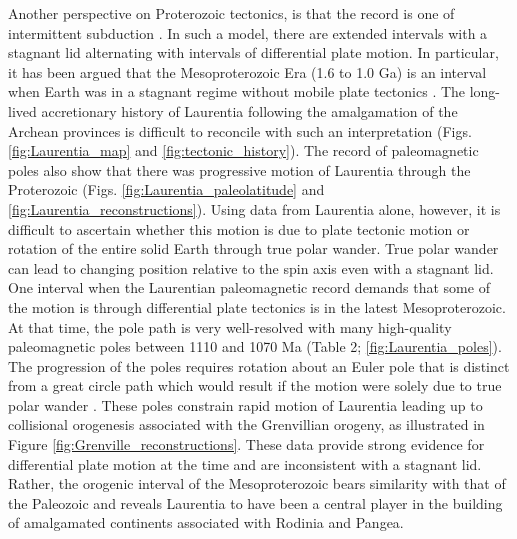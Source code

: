 \documentclass[twocolumn, switch]{article} %
\begin{document}
Another perspective on Proterozoic tectonics, is that the record is one of intermittent subduction \citep{Silver2008a, ONeill2013a}. In such a model, there are extended intervals with a stagnant lid alternating with intervals of differential plate motion. In particular, it has been argued that the Mesoproterozoic Era (1.6 to 1.0 Ga) is an interval when Earth was in a stagnant regime without mobile plate tectonics \citep{Silver2008a, ONeill2013a}. The long-lived accretionary history of Laurentia following the amalgamation of the Archean provinces is difficult to reconcile with such an interpretation (Figs. \ref{fig:Laurentia_map} and \ref{fig:tectonic_history}). The record of paleomagnetic poles also show that there was progressive motion of Laurentia through the Proterozoic (Figs. \ref{fig:Laurentia_paleolatitude} and \ref{fig:Laurentia_reconstructions}). Using data from Laurentia alone, however, it is difficult to ascertain whether this motion is due to plate tectonic motion or rotation of the entire solid Earth through true polar wander. True polar wander can lead to changing position relative to the spin axis even with a stagnant lid. One interval when the Laurentian paleomagnetic record demands that some of the motion is through differential plate tectonics is in the latest Mesoproterozoic. At that time, the pole path is very well-resolved with many high-quality paleomagnetic poles between 1110 and 1070 Ma (Table 2; \ref{fig:Laurentia_poles}). The progression of the poles requires rotation about an Euler pole that is distinct from a great circle path which would result if the motion were solely due to true polar wander \citep{Swanson-Hysell2019a}. These poles constrain rapid motion of Laurentia leading up to collisional orogenesis associated with the Grenvillian orogeny, as illustrated in Figure \ref{fig:Grenville_reconstructions}. These data provide strong evidence for differential plate motion at the time and are inconsistent with a stagnant lid. Rather, the orogenic interval of the Mesoproterozoic bears similarity with that of the Paleozoic and reveals Laurentia to have been a central player in the building of amalgamated continents associated with Rodinia and Pangea.
\end{document}
